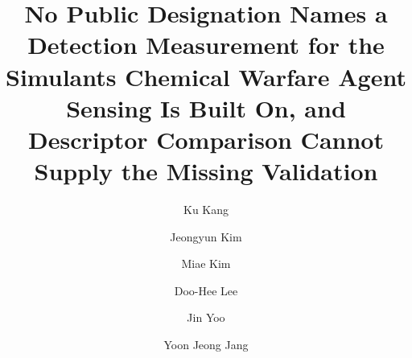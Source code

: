 \documentclass[1p,times]{elsarticle}
\begin{document}
\begin{frontmatter}

\title{No Public Designation Names a Detection Measurement for the Simulants
Chemical Warfare Agent Sensing Is Built On, and Descriptor Comparison Cannot
Supply the Missing Validation}

%
\author[cbrn]{Ku Kang}
\author[cbrn]{Jeongyun Kim}
\author[cbrn]{Miae Kim}
\author[kma]{Doo-Hee Lee}
\author[cbrn]{Jin Yoo}
\author[cbrn]{Yoon Jeong Jang}
\address[cbrn]{Chemical, Biological, Radiological and Nuclear (CBRN) Defense
Research Institute, Ministry of National Defense, Seoul, Republic of Korea}
\address[kma]{Department of Civil Engineering and Environmental Sciences,
Korea Military Academy, Seoul 01805, Republic of Korea}


\end{frontmatter}
\end{document}
